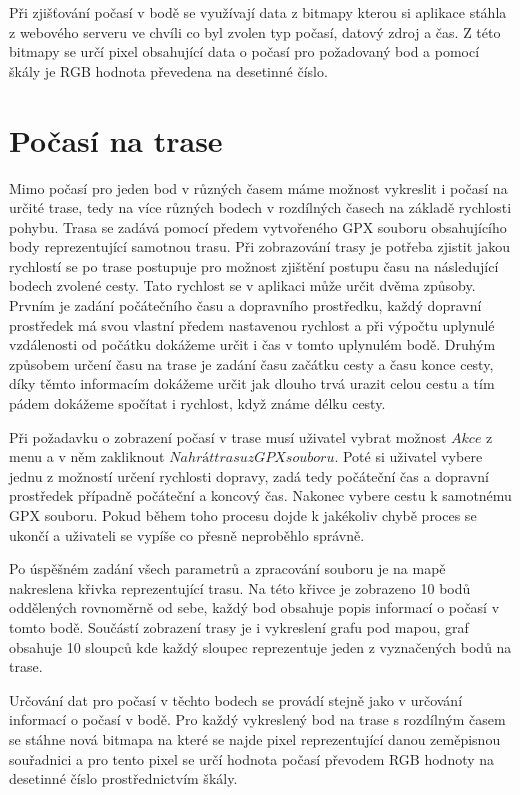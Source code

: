 \documentclass[czech,bachelor,dept460,male,csharp,cpdeclaration]{diploma}
\begin{document}
	Při zjišťování počasí v bodě se využívají data z bitmapy kterou si aplikace stáhla z webového serveru ve chvíli co byl zvolen typ počasí, datový zdroj a čas. Z této bitmapy se určí pixel obsahující data o počasí pro požadovaný bod a pomocí škály je RGB hodnota převedena na desetinné číslo.
	
	\section{Počasí na trase}
	
	Mimo počasí pro jeden bod v různých časem máme možnost vykreslit i počasí na určité trase, tedy na více různých bodech v rozdílných časech na základě rychlosti pohybu. Trasa se zadává pomocí předem vytvořeného GPX souboru obsahujícího body reprezentující samotnou trasu. Při zobrazování trasy je potřeba zjistit jakou rychlostí se po trase postupuje pro možnost zjištění postupu času na následující bodech zvolené cesty. Tato rychlost se v aplikaci může určit dvěma způsoby. Prvním je zadání počátečního času a dopravního prostředku, každý dopravní prostředek má svou vlastní předem nastavenou rychlost a při výpočtu uplynulé vzdálenosti od počátku dokážeme určit i čas v tomto uplynulém bodě. Druhým způsobem určení času na trase je zadání času začátku cesty a času konce cesty, díky těmto informacím dokážeme určit jak dlouho trvá urazit celou cestu a tím pádem dokážeme spočítat i rychlost, když známe délku cesty.
	
	Při požadavku o zobrazení počasí v trase musí uživatel vybrat možnost $Akce$ z menu a v něm zakliknout $Nahrát trasu z GPX souboru$. Poté si uživatel vybere jednu z možností určení rychlosti dopravy, zadá tedy počáteční čas a dopravní prostředek případně počáteční a koncový čas. Nakonec vybere cestu k samotnému GPX souboru. Pokud během toho procesu dojde k jakékoliv chybě proces se ukončí a uživateli se vypíše co přesně neproběhlo správně.
	
	Po úspěšném zadání všech parametrů a zpracování souboru je na mapě nakreslena křivka reprezentující trasu. Na této křivce je zobrazeno 10 bodů oddělených rovnoměrně od sebe, každý bod obsahuje popis informací o počasí v tomto bodě. Součástí zobrazení trasy je i vykreslení grafu pod mapou, graf obsahuje 10 sloupců kde každý sloupec reprezentuje jeden z vyznačených bodů na trase. 
	
	Určování dat pro počasí v těchto bodech se provádí stejně jako v určování informací o počasí v bodě. Pro každý vykreslený bod na trase s rozdílným časem se stáhne nová bitmapa na které se najde pixel reprezentující danou zeměpisnou souřadnici a pro tento pixel se určí hodnota počasí převodem RGB hodnoty na desetinné číslo prostřednictvím škály.
	
\end{document}
